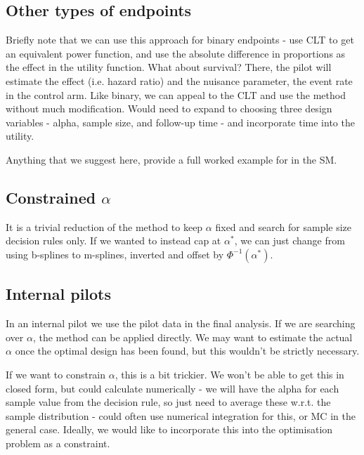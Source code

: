 \documentclass[sagev, Crown]{sagej} %
\begin{document}
\subsection{Other types of endpoints}

Briefly note that we can use this approach for binary endpoints - use CLT to get an equivalent power function, and use the absolute difference in proportions as the effect in the utility function. What about survival? There, the pilot will estimate the effect (i.e. hazard ratio) and the nuisance parameter, the event rate in the control arm. Like binary, we can appeal to the CLT and use the method without much modification. Would need to expand to choosing three design variables - alpha, sample size, and follow-up time - and incorporate time into the utility.

Anything that we suggest here, provide a full worked example for in the SM.

\subsection{Constrained $\alpha$}

It is a trivial reduction of the method to keep $\alpha$ fixed and search for sample size decision rules only. If we wanted to instead cap at $\alpha^*$, we can just change from using b-splines to m-splines, inverted and offset by $\Phi^{-1}(\alpha^*)$.

\subsection{Internal pilots}

In an internal pilot we use the pilot data in the final analysis. If we are searching over $\alpha$, the method can be applied directly. We may want to estimate the actual $\alpha$ once the optimal design has been found, but this wouldn't be strictly necessary.

If we want to constrain $\alpha$, this is a bit trickier. We won't be able to get this in closed form, but could calculate numerically - we will have the alpha for each sample value from the decision rule, so just need to average these w.r.t. the sample distribution - could often use numerical integration for this, or MC in the general case. Ideally, we would like to incorporate this into the optimisation problem as a constraint.
\end{document}
